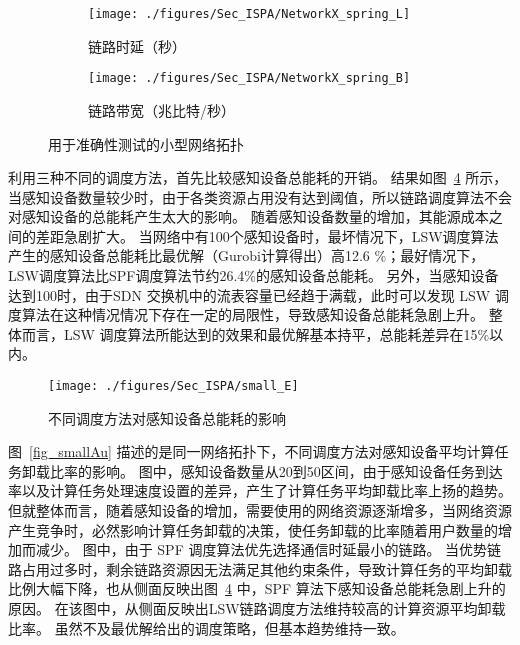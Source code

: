 \begin{figure}[!t]
  \centering
  \begin{subfigure}[b]{0.45\linewidth}
    \texttt{[image: ./figures/Sec\_ISPA/NetworkX\_spring\_L]}
    \label{fig_smallNetworkL}
    \caption{链路时延（秒）}
  \end{subfigure} %
  \begin{subfigure}[b]{0.45\linewidth}    
    \texttt{[image: ./figures/Sec\_ISPA/NetworkX\_spring\_B]}
    \label{fig_smallNetworkB}
    \caption{链路带宽（兆比特/秒）}
  \end{subfigure} 
  \caption{用于准确性测试的小型网络拓扑}
  \label{fig_smallNetwork}
\end{figure}

利用三种不同的调度方法，首先比较感知设备总能耗的开销。
结果如图~\ref{fig_smallE} 所示，当感知设备数量较少时，由于各类资源占用没有达到阈值，所以链路调度算法不会对感知设备的总能耗产生太大的影响。
随着感知设备数量的增加，其能源成本之间的差距急剧扩大。
当网络中有100个感知设备时，最坏情况下，LSW调度算法产生的感知设备总能耗比最优解（Gurobi计算得出）高12.6 \%；最好情况下，LSW调度算法比SPF调度算法节约26.4\%的感知设备总能耗。
另外，当感知设备达到100时，由于SDN 交换机中的流表容量已经趋于满载，此时可以发现 LSW 调度算法在这种情况情况下存在一定的局限性，导致感知设备总能耗急剧上升。
整体而言，LSW 调度算法所能达到的效果和最优解基本持平，总能耗差异在15\%以内。

\begin{figure}[!h]
  \centering
  \texttt{[image: ./figures/Sec\_ISPA/small\_E]}
  \vspace{-1em}
  \caption{不同调度方法对感知设备总能耗的影响}
  \label{fig_smallE}
\end{figure}


图~\ref{fig_smallAu} 描述的是同一网络拓扑下，不同调度方法对感知设备平均计算任务卸载比率的影响。
图中，感知设备数量从20到50区间，由于感知设备任务到达率以及计算任务处理速度设置的差异，产生了计算任务平均卸载比率上扬的趋势。
但就整体而言，随着感知设备的增加，需要使用的网络资源逐渐增多，当网络资源产生竞争时，必然影响计算任务卸载的决策，使任务卸载的比率随着用户数量的增加而减少。
图中，由于 SPF 调度算法优先选择通信时延最小的链路。
当优势链路占用过多时，剩余链路资源因无法满足其他约束条件，导致计算任务的平均卸载比例大幅下降，也从侧面反映出图~\ref{fig_smallE} 中，SPF 算法下感知设备总能耗急剧上升的原因。
在该图中，从侧面反映出LSW链路调度方法维持较高的计算资源平均卸载比率。
虽然不及最优解给出的调度策略，但基本趋势维持一致。

